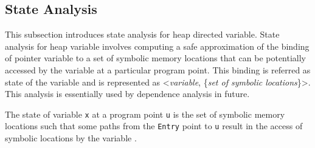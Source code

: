 \subsection{State Analysis}
This subsection introduces state analysis for heap directed variable. State analysis for heap variable involves computing a safe approximation of 
the binding of pointer variable to a set of symbolic memory locations that can be potentially accessed by the variable at a particular program point. This binding is referred as state of the variable and is represented as <\emph{variable}, \{\emph{set of symbolic locations}\}>. This analysis is essentially used by dependence analysis in future. 
\begin{mydef}{
The state of variable {\tt x} at a program point {\tt u} is the set of symbolic memory locations such that some paths from the {\tt Entry} point to {\tt u} result in the access of symbolic locations by the variable .
}
\end{mydef}

